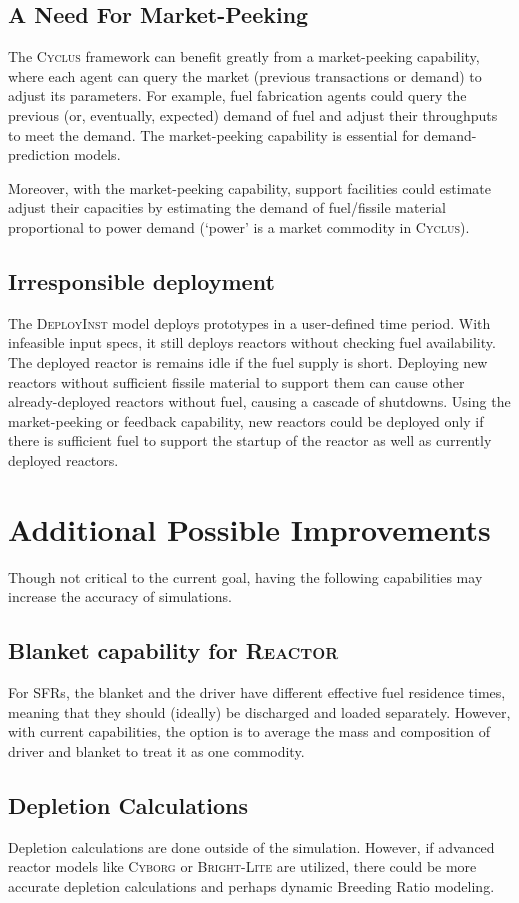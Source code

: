 \documentclass{article}
\newcommand{\Cyclus}{\textsc{Cyclus}\xspace}%
\begin{document}
\subsection{A Need For Market-Peeking}
The \Cyclus framework can benefit greatly from a market-peeking capability,
where each agent can query the market (previous transactions or demand) to adjust its parameters. For example, fuel fabrication
agents could query the previous (or, eventually, expected) demand of fuel and adjust their throughputs to meet the demand. 
The market-peeking capability is essential for demand-prediction models.

Moreover, with the market-peeking capability, support facilities could estimate adjust their
capacities by estimating
the demand of fuel/fissile material proportional to power demand (`power' is a market commodity in \Cyclus).

\subsection{Irresponsible deployment}
The \textsc{DeployInst}\xspace model deploys prototypes in a user-defined time period.
With infeasible input specs, it still deploys reactors without checking fuel availability.
The deployed reactor is remains idle if the fuel supply is short. Deploying new reactors
without sufficient fissile material to support them can cause other already-deployed reactors without fuel, causing
a cascade of shutdowns. Using the market-peeking or feedback capability, new reactors could be deployed only
if there is sufficient fuel to support the startup of the reactor as well as currently deployed reactors. 


\section{Additional Possible Improvements}
Though not critical to the current goal, having the following capabilities may increase
the accuracy of simulations.


\subsection{Blanket capability for \textsc{Reactor}\xspace}
For \glspl{SFR}, the blanket and the driver have different effective fuel residence times, meaning that
they should (ideally) be discharged and loaded separately. However, with current capabilities, the option is to average
the mass and composition of driver and blanket to treat it as one commodity.

\subsection{Depletion Calculations}
Depletion calculations are done outside of the simulation. However, if advanced reactor models like \textsc{Cyborg}\xspace
or \textsc{Bright-Lite}\xspace are utilized, there could be more accurate depletion calculations and 
perhaps dynamic Breeding Ratio modeling.



\end{document}
